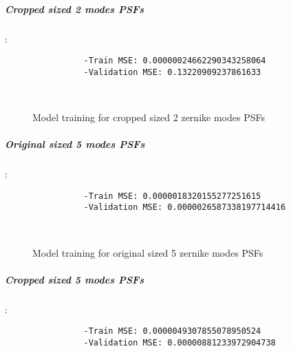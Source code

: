 		\subparagraph{Cropped sized 2 modes PSFs}:\\
		\begin{lstlisting}	
        		-Train MSE: 0.00000024662290343258064
        		-Validation MSE: 0.13220909237861633
		\end{lstlisting}
		
		\begin{figure*}[ht!]
			\hspace{\fill}
			\hspace{\fill}
			\\
			\caption{Model training for cropped sized 2 zernike modes PSFs}
		\end{figure*}
		\FloatBarrier
		
		\subparagraph{Original sized 5 modes PSFs}:\\
		\begin{lstlisting}	
        		-Train MSE: 0.0000018320155277251615
        		-Validation MSE: 0.0000026587338197714416
		\end{lstlisting}
		
		\begin{figure*}[ht!]
			\hspace{\fill}
			\hspace{\fill}
			\\
			\caption{Model training for original sized 5 zernike modes PSFs}
		\end{figure*}
		\FloatBarrier
		
		\subparagraph{Cropped sized 5 modes PSFs}:\\
		\begin{lstlisting}	
        		-Train MSE: 0.0000049307855078950524
        		-Validation MSE: 0.00000881233972904738
		\end{lstlisting}
		
